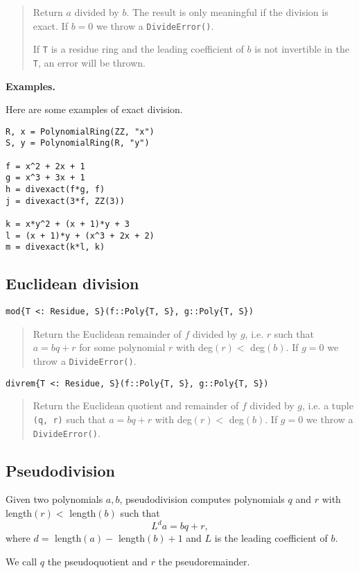 \documentclass[a4paper,10pt]{article}
\newcommand{\code}{\lstinline}
\newcommand{\desc}[1]{\vspace{-3mm}\begin{quote}#1\end{quote}}
\begin{document}
{{{{{{\desc{Return $a$ divided by $b$. The result is only meaningful if the division is
exact. If $b = 0$ we throw a \code{DivideError()}. 

If \code{T} is a residue ring and the leading coefficient of $b$ is not invertible
in the \code{T}, an error will be thrown.} 

\textbf{Examples.}

Here are some examples of exact division.

\begin{lstlisting}
R, x = PolynomialRing(ZZ, "x")
S, y = PolynomialRing(R, "y")

f = x^2 + 2x + 1
g = x^3 + 3x + 1
h = divexact(f*g, f)
j = divexact(3*f, ZZ(3))

k = x*y^2 + (x + 1)*y + 3
l = (x + 1)*y + (x^3 + 2x + 2)
m = divexact(k*l, k)
\end{lstlisting}

\subsection{Euclidean division}

\begin{lstlisting}
mod{T <: Residue, S}(f::Poly{T, S}, g::Poly{T, S})
\end{lstlisting}

\desc{Return the Euclidean remainder of $f$ divided by $g$, i.e. $r$ such 
that $a = bq + r$ for some polynomial $r$ with deg$(r) <$ deg$(b)$. If 
$g = 0$ we throw a \code{DivideError()}.}

\begin{lstlisting}
divrem{T <: Residue, S}(f::Poly{T, S}, g::Poly{T, S})
\end{lstlisting}

\desc{Return the Euclidean quotient and remainder of $f$ divided by $g$, i.e.
a tuple \code{(q, r)} such that $a = bq + r$ with deg$(r) <$ deg$(b)$. If 
$g = 0$ we throw a \code{DivideError()}.}


\subsection{Pseudodivision}

Given two polynomials $a, b$, pseudodivision computes polynomials $q$ and $r$
with length$(r) <$ length$(b)$ such that
$$L^d a = bq + r,$$
where $d =$ length$(a) -$ length$(b) + 1$ and $L$ is the leading coefficient
of $b$.

We call $q$ the pseudoquotient and $r$ the pseudoremainder.

}}}}}}
\end{document}
